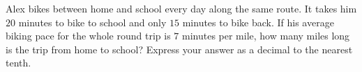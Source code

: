 Alex bikes between home and school every day along the same route. It takes him $20$ minutes to bike to school and only $15$ minutes to bike back. If his average biking pace for the whole round trip is $7$ minutes per mile, how many miles long is the trip from home to school? Express your answer as a decimal to the nearest tenth.
